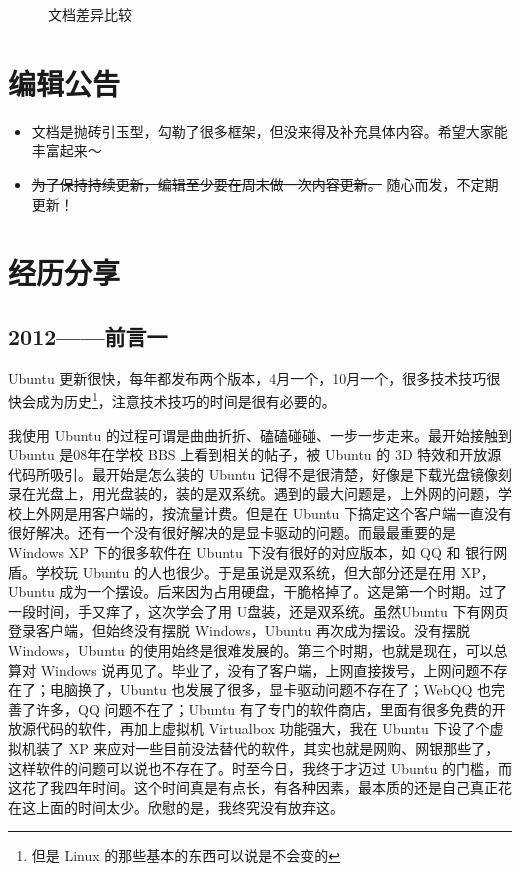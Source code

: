 \documentclass[cn,11pt,chinese,twoside]{elegantbook}
\begin{document}
\begin{figure}[h!]
\centering
{}
\caption{文档差异比较}
\label{fig:367}
\end{figure}



\section*{编辑公告}
\begin{itemize}
\item 文档是抛砖引玉型，勾勒了很多框架，但没来得及补充具体内容。希望大家能丰富起来～
\item \sout{为了保持持续更新，编辑至少要在周末做一次内容更新。} 随心而发，不定期更新！
\end{itemize}



\section*{经历分享}
\subsection*{2012——前言一}
    Ubuntu 更新很快，每年都发布两个版本，4月一个，10月一个，很多技术技巧很快会成为历史\footnote{但是 Linux 的那些基本的东西可以说是不会变的}，注意技术技巧的时间是很有必要的。

    我使用 Ubuntu 的过程可谓是曲曲折折、磕磕碰碰、一步一步走来。最开始接触到 Ubuntu 是08年在学校 BBS 上看到相关的帖子，被 Ubuntu 的 3D 特效和开放源代码所吸引。最开始是怎么装的 Ubuntu 记得不是很清楚，好像是下载光盘镜像刻录在光盘上，用光盘装的，装的是双系统。遇到的最大问题是，上外网的问题，学校上外网是用客户端的，按流量计费。但是在 Ubuntu 下搞定这个客户端一直没有很好解决。还有一个没有很好解决的是显卡驱动的问题。而最最重要的是 Windows  XP 下的很多软件在 Ubuntu 下没有很好的对应版本，如 QQ 和 银行网盾。学校玩 Ubuntu 的人也很少。于是虽说是双系统，但大部分还是在用 XP， Ubuntu 成为一个摆设。后来因为占用硬盘，干脆格掉了。这是第一个时期。过了一段时间，手又痒了，这次学会了用 U盘装，还是双系统。虽然Ubuntu 下有网页登录客户端，但始终没有摆脱 Windows，Ubuntu 再次成为摆设。没有摆脱Windows，Ubuntu 的使用始终是很难发展的。第三个时期，也就是现在，可以总算对 Windows 说再见了。毕业了，没有了客户端，上网直接拨号，上网问题不存在了；电脑换了，Ubuntu 也发展了很多，显卡驱动问题不存在了；WebQQ 也完善了许多，QQ 问题不在了；Ubuntu 有了专门的软件商店，里面有很多免费的开放源代码的软件，再加上虚拟机 Virtualbox 功能强大，我在 Ubuntu 下设了个虚拟机装了 XP 来应对一些目前没法替代的软件，其实也就是网购、网银那些了，这样软件的问题可以说也不存在了。时至今日，我终于才迈过 Ubuntu 的门槛，而这花了我四年时间。这个时间真是有点长，有各种因素，最本质的还是自己真正花在这上面的时间太少。欣慰的是，我终究没有放弃这。
    
\end{document}
